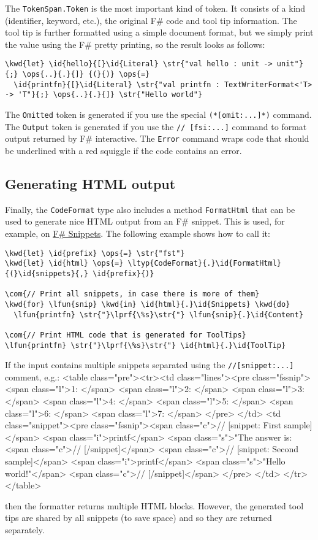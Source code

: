 \documentclass{article}
\newcommand{\id}[1]{\textcolor{black}{#1}}
\newcommand{\com}[1]{\textcolor{officegreen}{#1}}
\newcommand{\kwd}[1]{\textcolor{navy}{#1}}
\newcommand{\ops}[1]{\textcolor{purple}{#1}}
\newcommand{\str}[1]{\textcolor{olive}{#1}}
\begin{document}
The \texttt{TokenSpan.Token} is the most important kind of token. It consists of a kind
(identifier, keyword, etc.), the original F\# code and tool tip information.
The tool tip is further formatted using a simple document format, but we simply
print the value using the F\# pretty printing, so the result looks as follows:
\begin{Verbatim}[commandchars=\\\{\}]
\kwd{let} \id{hello}{[}\id{Literal} \str{"val hello : unit -> unit"}{;} \ops{..}{.}{]} {(}{)} \ops{=} 
  \id{printfn}{[}\id{Literal} \str{"val printfn : TextWriterFormat<'T> -> 'T"}{;} \ops{..}{.}{]} \str{"Hello world"}

\end{Verbatim}



The \texttt{Omitted} token is generated if you use the special \texttt{(*[omit:...]*)} command.
The \texttt{Output} token is generated if you use the \texttt{// [fsi:...]} command to format
output returned by F\# interactive. The \texttt{Error} command wraps code that should be
underlined with a red squiggle if the code contains an error.
\subsection*{Generating HTML output}



Finally, the \texttt{CodeFormat} type also includes a method \texttt{FormatHtml} that can be used
to generate nice HTML output from an F\# snippet. This is used, for example, on
\href{http://www.fssnip.net}{F\# Snippets}. The following example shows how to call it:
\begin{Verbatim}[commandchars=\\\{\}]
\kwd{let} \id{prefix} \ops{=} \str{"fst"} 
\kwd{let} \id{html} \ops{=} \ltyp{CodeFormat}{.}\id{FormatHtml}{(}\id{snippets}{,} \id{prefix}{)}

\com{// Print all snippets, in case there is more of them}
\kwd{for} \lfun{snip} \kwd{in} \id{html}{.}\id{Snippets} \kwd{do}
  \lfun{printfn} \str{"}\lprf{\%s}\str{"} \lfun{snip}{.}\id{Content}

\com{// Print HTML code that is generated for ToolTips}
\lfun{printfn} \str{"}\lprf{\%s}\str{"} \id{html}{.}\id{ToolTip}
\end{Verbatim}



If the input contains multiple snippets separated using the \texttt{//[snippet:...]} comment, e.g.:
<table class="pre"><tr><td class="lines"><pre class="fssnip">
<span class="l">1: </span>
<span class="l">2: </span>
<span class="l">3: </span>
<span class="l">4: </span>
<span class="l">5: </span>
<span class="l">6: </span>
<span class="l">7: </span>
</pre>
</td>
<td class="snippet"><pre class="fssnip"><span class="c">// [snippet: First sample]</span>
<span class="i">printf</span> <span class="s">"The answer is: %
<span class="c">// [/snippet]</span>
<span class="c">// [snippet: Second sample]</span>
<span class="i">printf</span> <span class="s">"Hello world!"</span>
<span class="c">// [/snippet]</span>
</pre>
</td>
</tr>
</table>


then the formatter returns multiple HTML blocks. However, the generated tool tips
are shared by all snippets (to save space) and so they are returned separately.
\end{document}
